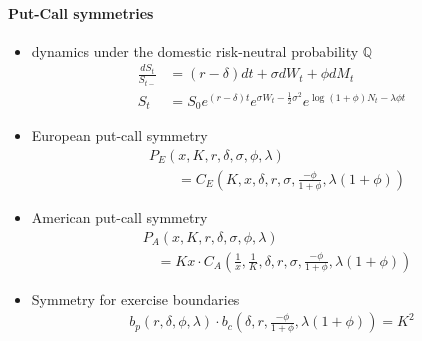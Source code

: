 \documentclass[a4paper,landscape,8pt,fleqn]{scrartcl}
\begin{document}
\begin{multicols*}{4}
\paragraph{Put-Call symmetries}
\begin{itemize}
\item dynamics under the domestic risk-neutral probability $\mathbb{Q}$
\begin{align*}
\frac{dS_t}{S_{t-}} &= (r-\delta) dt + \sigma dW_t + \phi dM_t \\
S_t &= S_0 e^{(r - \delta) t} e^{\sigma W_t - \frac{1}{2} \sigma^2} e^{\log(1+\phi) N_t - \lambda \phi t}
\end{align*}
\item European put-call symmetry
\begin{align*}
&P_E \left( x,K,r,\delta,\sigma,\phi,\lambda \right) \\
&\qquad = C_E \left( K,x,\delta,r,\sigma,\frac{-\phi}{1+\phi},\lambda(1+\phi) \right)
\end{align*}
\item American put-call symmetry
\begin{align*}
&P_A \left( x,K,r,\delta,\sigma,\phi,\lambda \right) \\
&\quad = K x \cdot C_A \left( \frac{1}{x},\frac{1}{K},\delta,r,\sigma,\frac{-\phi}{1+\phi},\lambda(1+\phi) \right)
\end{align*}
\item Symmetry for exercise boundaries
\begin{align*}
b_p \left( r,\delta,\phi,\lambda \right) \cdot b_c \left( \delta,r,\frac{-\phi}{1+\phi},\lambda(1+\phi) \right) = K^2
\end{align*}
\end{itemize}


\end{multicols*}
\end{document}
